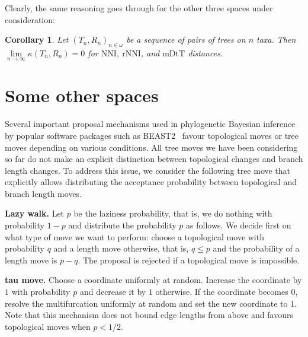 \documentclass{amsart}
\newtheorem{corollary}[lemma]{Corollary}
\newcommand{\nni}{\mathrm{NNI}}
\newcommand{\rnni}{\mathrm{rNNI}}
\newcommand{\mdts}{\mathrm{mDtT}}
\begin{document}
Clearly, the same reasoning goes through for the other three spaces under consideration:

\begin{corollary}
Let $(T_n,R_n)_{n\in\omega}$ be a sequence of pairs of trees on $n$ taxa.
Then $\lim\limits_{n \to \infty}\kappa(T_n,R_n) = 0$ for $\nni$, $\rnni$, and $\mdts$ distances. 
\end{corollary}

\section{Some other spaces}

Several important proposal mechanisms used in phylogenetic Bayesian inference by 
popular software packages such as BEAST2~\cite{beast2} favour topological moves
or tree moves depending on various conditions. All tree moves we have been 
considering so far do not make an explicit distinction between topological 
changes and branch length changes. To address this issue, we
consider the
following tree move that explicitly allows distributing the acceptance 
probability between topological and branch length moves. 

{\bf Lazy walk.} Let $p$ be the laziness probability, that is, we do nothing 
with probability $1-p$ and distribute the probability $p$ as follows. 
We decide first on what type of move we want to perform: choose a topological 
move with probability $q$ and a length move otherwise, that is, $q \leq p$
and the probability of a length move is $p-q$. The proposal is rejected if
a topological move is impossible. 

{\bf tau move.} Choose a coordinate uniformly at random. Increase the
coordinate by $1$ with probability $p$ and decrease it by $1$ otherwise.
If the coordinate becomes $0$, resolve the multifurcation uniformly at
random and set the new coordinate to $1$. Note that this mechanism 
does not bound edge lengths from above and favours topological moves when 
$p<1/2$. 



\end{document}
